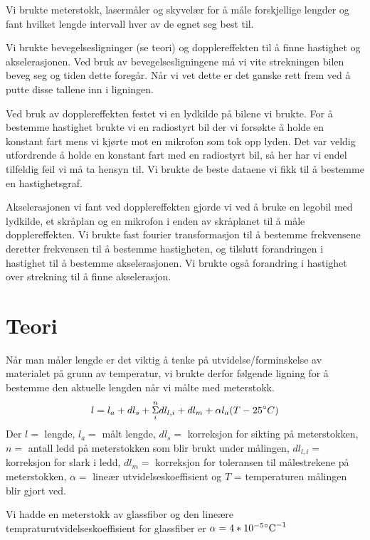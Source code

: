 \documentclass[norsk,a4paper,12pt]{article}
\begin{document}
Vi brukte meterstokk, lasermåler og skyvelær for å måle forskjellige lengder og fant hvilket lengde intervall hver av de egnet seg best til. 

Vi brukte bevegelsesligninger  (se teori) og dopplereffekten til å finne hastighet og akselerasjonen. Ved bruk av bevegelsesligningene må vi vite strekningen bilen beveg seg og tiden dette foregår. Når vi vet dette er det ganske rett frem ved å putte disse tallene inn i ligningen. 

Ved bruk av dopplereffekten festet vi en lydkilde på bilene vi brukte. For å bestemme hastighet brukte vi en radiostyrt bil der vi forsøkte å holde en konstant fart mens vi kjørte mot en mikrofon som tok opp lyden. Det var veldig utfordrende å holde en konstant fart med en radiostyrt bil, så her har vi endel tilfeldig feil vi må ta hensyn til. Vi brukte de beste dataene vi fikk til å bestemme en hastighetsgraf. 

Akselerasjonen vi fant ved dopplereffekten gjorde vi ved å bruke en legobil med lydkilde, et skråplan og en mikrofon i enden av skråplanet til å måle dopplereffekten. 
Vi brukte fast fourier transformasjon til å bestemme frekvensene deretter frekvensen til å bestemme hastigheten, og tilslutt forandringen i hastighet til å bestemme akselerasjonen. Vi brukte også forandring i hastighet over strekning til å finne akselerasjon.


\section{Teori}
Når man måler lengde er det viktig å tenke på utvidelse/forminskelse av materialet på grunn av temperatur, vi brukte derfor følgende ligning for å bestemme den aktuelle lengden når vi målte med meterstokk. 
\begin{equation}
l = l_a + dl_s +\underset{i}{\overset{n}{\Sigma}}dl_{l,i}+dl_m + \alpha l_a(T-25\text{\degree}C)
\label{lengde}
\end{equation}
Der $l=$ lengde, $l_a =$ målt lengde, $dl_s=$ korreksjon for sikting på meterstokken, $n=$ antall ledd på meterstokken som blir brukt under målingen, $dl_{l,i}=$korreksjon for slark i ledd, $dl_m=$ korreksjon for toleransen til målestrekene på meterstokken, $\alpha=$ lineær utvidelseskoeffisient og $T$ = temperaturen målingen blir gjort ved.

Vi hadde en meterstokk av glassfiber og den lineære tempraturutvidelseskoeffisient for glassfiber er $\alpha = 4*10^{-5} \text{\degree C}^{-1}$\\
\end{document}
